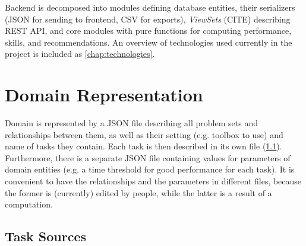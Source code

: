 
Backend is decomposed into modules defining database entities,
their serializers (JSON for sending to frontend, CSV for exports),
\emph{ViewSets} (CITE) describing REST API,
and core modules with pure functions
for computing performance, skills, and recommendations.
An overview of technologies used currently in the project
is included as \cref{chap:technologies}.

\section{Domain Representation}

Domain is represented by a JSON file describing all problem sets %
and relationships between them, as well as their setting (e.g. toolbox to use)
and name of tasks they contain.
Each task is then described in its own file (\cref{sec:impl.task-sources}).
Furthermore, there is a separate JSON file containing values for parameters
of domain entities (e.g. a time threshold for good performance for each task).
It is convenient to have the relationships and the parameters in different files,
because the former is (currently) edited by people, while the latter is
a result of a computation.

\subsection{Task Sources}
\label{sec:impl.task-sources}

